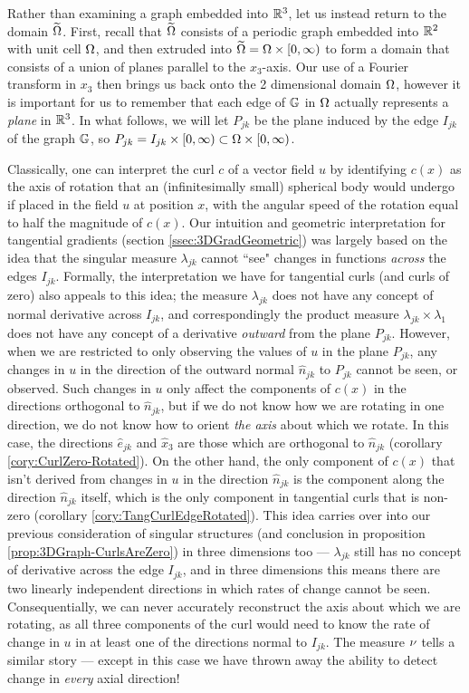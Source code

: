 Rather than examining a graph embedded into $\mathbb{R}^3$, let us instead return to the domain $\widetilde{\Omega}$.
First, recall that $\widetilde{\Omega}$ consists of a periodic graph embedded into $\mathbb{R}^2$ with unit cell $\Omega$, and then extruded into $\widetilde{\Omega} = \Omega\times[0,\infty)$ to form a domain that consists of a union of planes parallel to the $x_3$-axis.
Our use of a Fourier transform in $x_3$ then brings us back onto the 2 dimensional domain $\Omega$, however it is important for us to remember that each edge of $\mathbb{G}$ in $\Omega$ actually represents a \emph{plane} in $\mathbb{R}^3$.
In what follows, we will let $P_{jk}$ be the plane induced by the edge $I_{jk}$ of the graph $\mathbb{G}$, so $P_{jk} = I_{jk}\times[0,\infty)\subset\Omega\times[0,\infty)$.

Classically, one can interpret the curl $c$ of a vector field $u$ by identifying $c(x)$ as the axis of rotation that an (infinitesimally small) spherical body would undergo if placed in the field $u$ at position $x$, with the angular speed of the rotation equal to half the magnitude of $c(x)$.
Our intuition and geometric interpretation for tangential gradients (section \ref{ssec:3DGradGeometric}) was largely based on the idea that the singular measure $\lambda_{jk}$ cannot ``see" changes in functions \emph{across} the edges $I_{jk}$.
Formally, the interpretation we have for tangential curls (and curls of zero) also appeals to this idea; the measure $\lambda_{jk}$ does not have any concept of normal derivative across $I_{jk}$, and correspondingly the product measure $\lambda_{jk}\times\lambda_1$ does not have any concept of a derivative \emph{outward} from the plane $P_{jk}$.
However, when we are restricted to only observing the values of $u$ in the plane $P_{jk}$, any changes in $u$ in the direction of the outward normal $\widehat{n}_{jk}$ to $P_{jk}$ cannot be seen, or observed.
Such changes in $u$ only affect the components of $c(x)$ in the directions orthogonal to $\widehat{n}_{jk}$, but if we do not know how we are rotating in one direction, we do not know how to orient \emph{the axis} about which we rotate.
In this case, the directions $\widehat{e}_{jk}$ and $\widehat{x}_3$ are those which are orthogonal to $\widehat{n}_{jk}$ (corollary \ref{cory:CurlZero-Rotated}).
On the other hand, the only component of $c(x)$ that isn't derived from changes in $u$ in the direction $\widehat{n}_{jk}$ is the component along the direction $\widehat{n}_{jk}$ itself, which is the only component in tangential curls that is non-zero (corollary \ref{cory:TangCurlEdgeRotated}).
This idea carries over into our previous consideration of singular structures (and conclusion in proposition \ref{prop:3DGraph-CurlsAreZero}) in three dimensions too ---  $\lambda_{jk}$ still has no concept of derivative across the edge $I_{jk}$, and in three dimensions this means there are two linearly independent directions in which rates of change cannot be seen.
Consequentially, we can never accurately reconstruct the axis about which we are rotating, as all three components of the curl would need to know the rate of change in $u$ in at least one of the directions normal to $I_{jk}$.
The measure $\nu$ tells a similar story --- except in this case we have thrown away the ability to detect change in \emph{every} axial direction!

